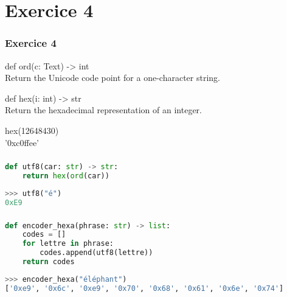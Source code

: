 \documentclass[svgnames,11pt]{beamer}
\begin{document}
\section{Exercice 4}
\begin{frame}
    \frametitle{Exercice 4}

\begin{aretenir}[Documentation]
    def ord(c: Text) -> int\\
    Return the Unicode code point for a one-character string.
\end{aretenir}
\begin{aretenir}[Documentation]
    def hex(i: int) -> str\\
    Return the hexadecimal representation of an integer.
    
    hex(12648430)\\
    '0xc0ffee'
\end{aretenir}
\end{frame}
\begin{frame}[fragile]
    \frametitle{}

\begin{center}
\begin{lstlisting}[language=Python , basicstyle=\ttfamily\small, xleftmargin=2em, xrightmargin=2em]
def utf8(car: str) -> str:
    return hex(ord(car))
\end{lstlisting}
\end{center} 
\begin{center}
\begin{lstlisting}[language=Python , basicstyle=\ttfamily\small, xleftmargin=2em, xrightmargin=2em]
>>> utf8("é")
0xE9
\end{lstlisting}
\label{CODE}
\end{center}
\end{frame}
\begin{frame}[fragile]
    \frametitle{}

\begin{center}
\begin{lstlisting}[language=Python , basicstyle=\ttfamily\small, xleftmargin=2em, xrightmargin=2em]
def encoder_hexa(phrase: str) -> list:
    codes = []
    for lettre in phrase:
        codes.append(utf8(lettre))
    return codes
\end{lstlisting}
\end{center} 
\begin{center}
\begin{lstlisting}[language=Python , basicstyle=\ttfamily\small, xleftmargin=2em, xrightmargin=2em]
>>> encoder_hexa("éléphant")
['0xe9', '0x6c', '0xe9', '0x70', '0x68', '0x61', '0x6e', '0x74']
\end{lstlisting}
\label{CODE}
\end{center}   

\end{frame}
\end{document}
